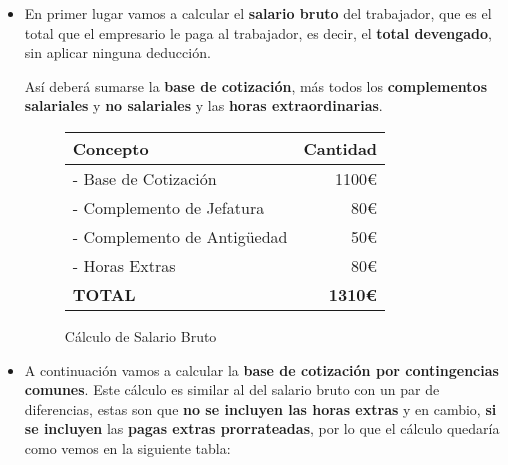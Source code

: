 \begin{itemize}
    \item En primer lugar vamos a calcular el \textbf{salario bruto} del trabajador, que es el total que el empresario le paga al trabajador, es decir, el \textbf{total devengado}, sin aplicar ninguna deducción.

    Así deberá sumarse la \textbf{base de cotización}, más todos los \textbf{complementos salariales} y \textbf{no salariales} y las \textbf{horas extraordinarias}.

        \begin{figure}[H]

        \vspace{3ex}
        \centering

        \setlength{\tabcolsep}{10pt}
        \renewcommand{\arraystretch}{1.4}

        \begin{tabular}{| l | r |}
            \hline
            \textbf{Concepto}  & \textbf{Cantidad} \\ \hline
            \centering - Base de Cotización & 1100€  \\ \hline
            \centering - Complemento de Jefatura & 80€  \\ \hline
            \centering - Complemento de Antigüedad & 50€  \\ \hline
            \centering - Horas Extras & 80€  \\ \hline
            \centering \textbf{TOTAL} &  \textbf{1310€} \\ \hline
        \end{tabular}
        \caption{Cálculo de Salario Bruto}
    \end{figure}

    \item A continuación vamos a calcular la \textbf{base de cotización por contingencias comunes}. Este cálculo es similar al del salario bruto con un par de diferencias, estas son que \textbf{no se incluyen las horas extras} y en cambio, \textbf{si se incluyen} las  \textbf{pagas extras prorrateadas}, por lo que el cálculo quedaría como vemos en la siguiente tabla:

    \begin{figure}[H]

        \vspace{3ex}
        \centering

        \setlength{\tabcolsep}{10pt}
        \renewcommand{\arraystretch}{1.4}


\end{figure}
\end{itemize}
